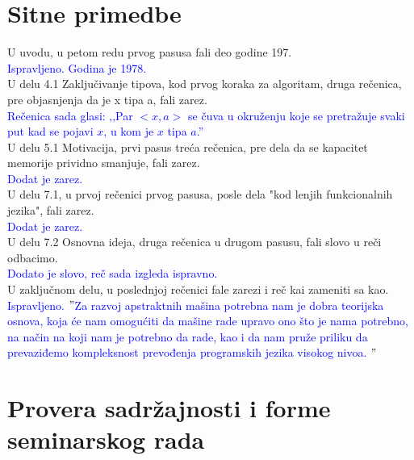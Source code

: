 \documentclass[a4paper]{report}
\newcommand{\odgovor}[1]{\textcolor{blue}{#1}}
\begin{document}
\section{Sitne primedbe}

U uvodu, u petom redu prvog pasusa fali deo godine 197. \\

\odgovor{Ispravljeno. Godina je 1978.}\\

U delu 4.1 Zaključivanje tipova, kod prvog koraka za algoritam, druga rečenica, pre objasnjenja da je x tipa a, fali zarez. \\

\odgovor{Rečenica sada glasi: ‚‚Par $<x, a>$ se čuva u okruženju koje se pretražuje svaki put kad se pojavi $x$, u kom je $x$ tipa $a$.''}\\

U delu 5.1 Motivacija, prvi pasus treća rečenica, pre dela da se kapacitet memorije prividno smanjuje, fali zarez.\\

\odgovor{Dodat je zarez.}\\

U delu 7.1, u prvoj rečenici prvog pasusa, posle dela "kod lenjih funkcionalnih jezika", fali zarez. \\

\odgovor{Dodat je zarez.}\\

U delu 7.2 Osnovna ideja, druga rečenica u drugom pasusu, fali slovo u reči odbacimo.\\

\odgovor{Dodato je slovo, reč sada izgleda ispravno.}\\

U zaključnom delu, u poslednjoj rečenici fale zarezi i reč kai zameniti sa kao. \\

\odgovor{Ispravljeno. $"$Za razvoj apstraktnih mašina potrebna nam je dobra teorijska osnova, koja će nam omogućiti da mašine rade upravo ono što je nama potrebno, na način na koji nam je potrebno da rade, kao i da nam pruže priliku da prevaziđemo kompleksnost prevođenja programskih jezika visokog nivoa. $"$}

\section{Provera sadržajnosti i forme seminarskog rada}
\end{document}
